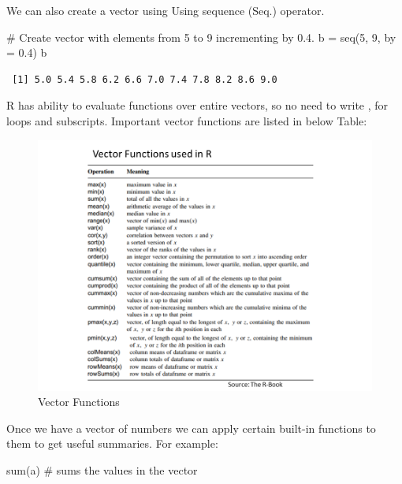 \documentclass[
  letterpaper,
  DIV=11,
  numbers=noendperiod]{scrreprt}
\newenvironment{Shaded}{\begin{snugshade}}{\end{snugshade}}
\newcommand{\AttributeTok}[1]{\textcolor[rgb]{0.40,0.45,0.13}{#1}}
\newcommand{\CommentTok}[1]{\textcolor[rgb]{0.37,0.37,0.37}{#1}}
\newcommand{\DecValTok}[1]{\textcolor[rgb]{0.68,0.00,0.00}{#1}}
\newcommand{\FloatTok}[1]{\textcolor[rgb]{0.68,0.00,0.00}{#1}}
\newcommand{\FunctionTok}[1]{\textcolor[rgb]{0.28,0.35,0.67}{#1}}
\newcommand{\NormalTok}[1]{\textcolor[rgb]{0.00,0.23,0.31}{#1}}
\newcommand{\OtherTok}[1]{\textcolor[rgb]{0.00,0.23,0.31}{#1}}
\begin{document}
We can also create a vector using Using sequence (Seq.) operator.

\begin{Shaded}
\begin{Highlighting}[]
\CommentTok{\# Create vector with elements from 5 to 9 incrementing by 0.4.}
\NormalTok{b }\OtherTok{=} \FunctionTok{seq}\NormalTok{(}\DecValTok{5}\NormalTok{, }\DecValTok{9}\NormalTok{, }\AttributeTok{by =} \FloatTok{0.4}\NormalTok{)}
\NormalTok{b}
\end{Highlighting}
\end{Shaded}

\begin{verbatim}
 [1] 5.0 5.4 5.8 6.2 6.6 7.0 7.4 7.8 8.2 8.6 9.0
\end{verbatim}

R has ability to evaluate functions over entire vectors, so no need to
write , for loops and subscripts. Important vector functions are listed
in below Table:

\begin{figure}

\caption{Vector Functions}

{\centering \includegraphics{Image/vector_functions.png}

}

\end{figure}

Once we have a vector of numbers we can apply certain built-in functions
to them to get useful summaries. For example:

\begin{Shaded}
\begin{Highlighting}[]
\FunctionTok{sum}\NormalTok{(a)        }\CommentTok{\# sums the values in the vector }
\end{Highlighting}
\end{Shaded}
\end{document}
